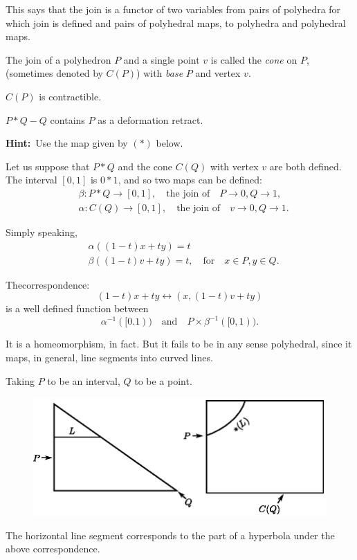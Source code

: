This says that the join is a functor of two variables from pairs of polyhedra for which join is defined and pairs of polyhedral maps, to polyhedra and polyhedral maps.

The join of a polyhedron $P$ and a single point $v$ is called the {\em cone} on $P$, (sometimes denoted by $C(P)$) with {\em base} $P$ and vertex $v$.

\setcounter{proposition}{5}
\begin{ex}\label{chap4-ex4.3.6}
$C(P)$ is contractible.
\end{ex}

\begin{ex}\label{chap4-ex4.3.7}
$P\ast Q-Q$ contains $P$ as a deformation retract.
\end{ex}

\noindent
{\bf Hint:}~Use the map given by $(*)$ below.

Let us suppose that $P\ast Q$ and the cone $C(Q)$ with vertex $v$ are both defined. The interval $[0,1]$ is $0*1$, and so two maps can be defined:
\begin{align*}
&\beta:P\ast Q\to [0,1],\quad\text{the join of}\quad P\to 0, Q\to 1,\\
&\alpha :C(Q)\to [0,1],\quad\text{the join of}\quad v\to 0, Q\to 1.
\end{align*}

Simply speaking,
\begin{align*}
& \alpha((1-t)x+ty)=t\\
& \beta ((1-t)v+ty)=t,\quad\text{for}\quad x\in P, y\in Q.
\end{align*}

The\pageoriginale correspondence:
\begin{equation*}
(1-t)x+ty\leftrightarrow (x,(1-t)v+ty)\tag{*}
\end{equation*}
is a well defined function between
$$
\alpha^{-1}([0.1))\quad\text{and}\quad P\times \beta^{-1}([0,1)).
$$

It is a homeomorphism, in fact. But it fails to be in any sense polyhedral, since it maps, in general, line segments into curved lines.

\begin{example*}
Taking $P$ to be an interval, $Q$ to be a point.
\begin{figure}[H]
\centering
\includegraphics{figure/fig9.eps}
\end{figure}

The horizontal line segment corresponds to the part of a hyperbola under the above correspondence.
\end{example*}

